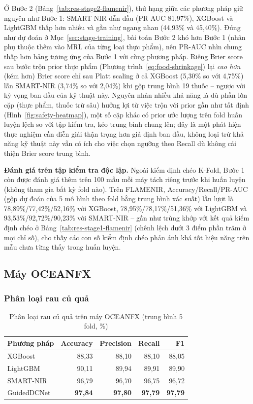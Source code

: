 \documentclass[10pt,twocolumn,twoside]{article}
\begin{document}
Ở Bước 2 (Bảng~\ref{tab:res-stage2-flamenir}), thứ hạng giữa các phương
pháp giữ nguyên như Bước 1: SMART-NIR dẫn đầu (PR-AUC 81,97\%), XGBoost và
LightGBM thấp hơn nhiều và gần như ngang nhau (44,93\% và 45,40\%). Đúng
như dự đoán ở Mục~\ref{sec:stage-training}, bài toán Bước 2 khó hơn Bước 1
(nhãn phụ thuộc thêm vào MRL của từng loại thực phẩm), nên PR-AUC nhìn
chung thấp hơn bảng tương ứng của Bước 1 với cùng phương pháp. Riêng Brier
score sau bước trộn prior thực phẩm
(Phương trình~\ref{eq:food-shrinkage}) lại \emph{cao hơn} (kém hơn) Brier
score chỉ sau Platt scaling ở cả XGBoost (5,30\% so với 4,75\%) lẫn
SMART-NIR (3,74\% so với 2,04\%) khi gộp trung bình 19 thuốc -- ngược với
kỳ vọng ban đầu của kỹ thuật này. Nguyên nhân nhiều khả năng là dù phần lớn
cặp (thực phẩm, thuốc trừ sâu) hưởng lợi từ việc trộn với prior gần như tất
định (Hình~\ref{fig:safety-heatmap}), một số cặp khác có prior ước lượng
trên fold huấn luyện lệch so với tập kiểm tra, kéo trung bình chung lên;
đây là một phát hiện thực nghiệm cần diễn giải thận trọng hơn giả định ban
đầu, không loại trừ khả năng kỹ thuật này vẫn có ích cho việc chọn ngưỡng
theo Recall dù không cải thiện Brier score trung bình.

\textbf{Đánh giá trên tập kiểm tra độc lập.} Ngoài kiểm định chéo K-Fold,
Bước 1 còn được đánh giá thêm trên 100 mẫu mỗi máy tách riêng trước khi
huấn luyện (không tham gia bất kỳ fold nào). Trên FLAMENIR, Accuracy/Recall/PR-AUC
(gộp dự đoán của 5 mô hình theo fold bằng trung bình xác suất) lần lượt là
78,89\%/77,42\%/52,16\% với XGBoost, 78,95\%/78,17\%/51,36\% với LightGBM
và 93,53\%/92,72\%/90,23\% với SMART-NIR -- gần như trùng khớp với kết quả
kiểm định chéo ở Bảng~\ref{tab:res-stage1-flamenir} (chênh lệch dưới 3 điểm
phần trăm ở mọi chỉ số), cho thấy các con số kiểm định chéo phản ánh khá
tốt hiệu năng trên mẫu chưa từng thấy trong huấn luyện.

\subsection{Máy OCEANFX}

\subsubsection{Phân loại rau củ quả}

\begin{table}[htbp]
\centering
\caption{Phân loại rau củ quả trên máy OCEANFX (trung bình 5 fold, \%)}
\label{tab:res-clf-oceanfx}
\footnotesize
\begin{tabular}{|l|r|r|r|r|}
\hline
\textbf{Phương pháp} & \textbf{Accuracy} & \textbf{Precision} & \textbf{Recall} & \textbf{F1} \\
\hline
XGBoost     & 88,33 & 88,10 & 88,10 & 88,05 \\
LightGBM    & 90,11 & 89,94 & 89,91 & 89,90 \\
SMART-NIR   & 96,79 & 96,70 & 96,75 & 96,72 \\
GuidedDCNet & \textbf{97,84} & \textbf{97,80} & \textbf{97,79} & \textbf{97,79} \\
\hline
\end{tabular}
\end{table}
\end{document}
